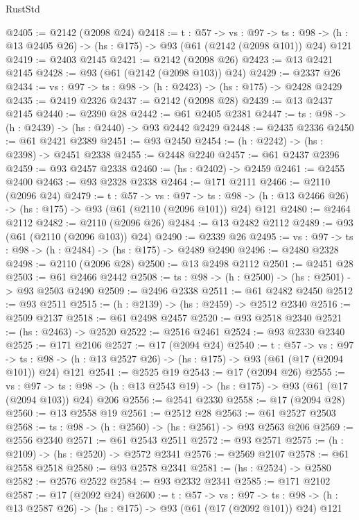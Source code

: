 \begin{lexlean}{RustStd}
\begin{coremodule}
@2405 := @2142 (@2098 @24)
@2418 := {t : @57} ->
  {vs : @97} ->
  {ts : @98} -> (h : @13 @2405 @26) -> (hs : @175) -> @93 (@61 (@2142 (@2098 @101)) @24) @121
@2419 := @2403 @2145
@2421 := @2142 (@2098 @26)
@2423 := @13 @2421 @2145
@2428 := @93 (@61 (@2142 (@2098 @103)) @24)
@2429 := @2337 @26
@2434 := {vs : @97} -> {ts : @98} -> (h : @2423) -> (hs : @175) -> @2428 @2429
@2435 := @2419 @2326
@2437 := @2142 (@2098 @28)
@2439 := @13 @2437 @2145
@2440 := @2390 @28
@2442 := @61 @2405 @2381
@2447 := {ts : @98} -> (h : @2439) -> (hs : @2440) -> @93 @2442 @2429
@2448 := @2435 @2336
@2450 := @61 @2421 @2389
@2451 := @93 @2450
@2454 := (h : @2242) -> (hs : @2398) -> @2451 @2338
@2455 := @2448 @2240
@2457 := @61 @2437 @2396
@2459 := @93 @2457 @2338
@2460 := (hs : @2402) -> @2459
@2461 := @2455 @2400
@2463 := @93 @2328 @2338
@2464 := @171 @2111
@2466 := @2110 (@2096 @24)
@2479 := {t : @57} ->
  {vs : @97} ->
  {ts : @98} -> (h : @13 @2466 @26) -> (hs : @175) -> @93 (@61 (@2110 (@2096 @101)) @24) @121
@2480 := @2464 @2112
@2482 := @2110 (@2096 @26)
@2484 := @13 @2482 @2112
@2489 := @93 (@61 (@2110 (@2096 @103)) @24)
@2490 := @2339 @26
@2495 := {vs : @97} -> {ts : @98} -> (h : @2484) -> (hs : @175) -> @2489 @2490
@2496 := @2480 @2328
@2498 := @2110 (@2096 @28)
@2500 := @13 @2498 @2112
@2501 := @2451 @28
@2503 := @61 @2466 @2442
@2508 := {ts : @98} -> (h : @2500) -> (hs : @2501) -> @93 @2503 @2490
@2509 := @2496 @2338
@2511 := @61 @2482 @2450
@2512 := @93 @2511
@2515 := (h : @2139) -> (hs : @2459) -> @2512 @2340
@2516 := @2509 @2137
@2518 := @61 @2498 @2457
@2520 := @93 @2518 @2340
@2521 := (hs : @2463) -> @2520
@2522 := @2516 @2461
@2524 := @93 @2330 @2340
@2525 := @171 @2106
@2527 := @17 (@2094 @24)
@2540 := {t : @57} ->
  {vs : @97} ->
  {ts : @98} -> (h : @13 @2527 @26) -> (hs : @175) -> @93 (@61 (@17 (@2094 @101)) @24) @121
@2541 := @2525 @19
@2543 := @17 (@2094 @26)
@2555 := {vs : @97} ->
  {ts : @98} -> (h : @13 @2543 @19) -> (hs : @175) -> @93 (@61 (@17 (@2094 @103)) @24) @206
@2556 := @2541 @2330
@2558 := @17 (@2094 @28)
@2560 := @13 @2558 @19
@2561 := @2512 @28
@2563 := @61 @2527 @2503
@2568 := {ts : @98} -> (h : @2560) -> (hs : @2561) -> @93 @2563 @206
@2569 := @2556 @2340
@2571 := @61 @2543 @2511
@2572 := @93 @2571
@2575 := (h : @2109) -> (hs : @2520) -> @2572 @2341
@2576 := @2569 @2107
@2578 := @61 @2558 @2518
@2580 := @93 @2578 @2341
@2581 := (hs : @2524) -> @2580
@2582 := @2576 @2522
@2584 := @93 @2332 @2341
@2585 := @171 @2102
@2587 := @17 (@2092 @24)
@2600 := {t : @57} ->
  {vs : @97} ->
  {ts : @98} -> (h : @13 @2587 @26) -> (hs : @175) -> @93 (@61 (@17 (@2092 @101)) @24) @121

\end{coremodule}
\end{lexlean}
